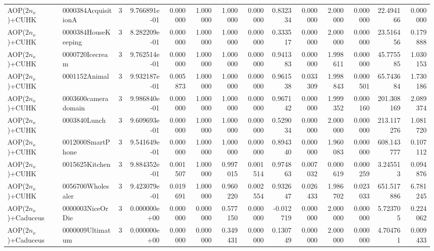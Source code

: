 \begin{tabular}{llrr|r|rr|rr|rr|rrr}
        AOP($2 n_o$)+CUHK &    0000384AcquisitionA &       3 & 9.766891e-01 & 0.000000 & 1.000000 &      1.000000 & 0.000000 &      0.832334 & 0.000000 &      2.000000 &    0.000000 &    22.494166 &    0.000000 \\
        AOP($2 n_o$)+CUHK &    0000384HouseKeeping &       3 & 8.282209e-01 & 0.000000 & 1.000000 &      1.000000 & 0.000000 &      0.333517 & 0.000000 &      2.000000 &    0.000000 &    23.516456 &    0.179888 \\
        AOP($2 n_o$)+CUHK &        0000720Icecream &       3 & 9.762514e-01 & 0.000000 & 1.000000 &      1.000000 & 0.000000 &      0.941383 & 0.000000 &      1.998611 &    0.000000 &    45.775585 &    1.030153 \\
        AOP($2 n_o$)+CUHK &          0001152Animal &       3 & 9.932187e-01 & 0.005873 & 1.000000 &      1.000000 & 0.000000 &      0.961538 & 0.033309 &      1.998843 &    0.000501 &    65.743684 &    1.730186 \\
        AOP($2 n_o$)+CUHK &    0003600cameradomain &       3 & 9.986840e-01 & 0.000000 & 1.000000 &      1.000000 & 0.000000 &      0.967142 & 0.000000 &      1.999352 &    0.000160 &   201.308169 &    2.089374 \\
        AOP($2 n_o$)+CUHK &           0003840Lunch &       3 & 9.609693e-01 & 0.000000 & 1.000000 &      1.000000 & 0.000000 &      0.529034 & 0.000000 &      2.000000 &    0.000000 &   213.117276 &    1.081720 \\
        AOP($2 n_o$)+CUHK &      0012000SmartPhone &       3 & 9.541649e-01 & 0.000000 & 1.000000 &      1.000000 & 0.000000 &      0.894340 & 0.000000 &      1.960083 &    0.000000 &   608.143777 &    0.107112 \\
        AOP($2 n_o$)+CUHK &         0015625Kitchen &       3 & 9.884352e-01 & 0.001507 & 1.000000 &      0.997015 & 0.001514 &      0.974863 & 0.007032 &      0.000619 &    0.000259 &     3.245513 &    0.094876 \\
        AOP($2 n_o$)+CUHK &      0056700Wholesaler &       3 & 9.423079e-01 & 0.019691 & 1.000000 &      0.960220 & 0.002554 &      0.932647 & 0.026433 &      1.986702 &    0.023033 &   651.517886 &    6.781245 \\
    AOP($2 n_o$)+Caduceus &       0000003NiceOrDie &       3 & 0.000000e+00 & 0.000000 & 0.000000 &      0.577150 & 0.000000 &     -0.012719 & 0.000000 &      2.000000 &    0.000000 &     5.723705 &    0.224062 \\
    AOP($2 n_o$)+Caduceus &       0000009Ultimatum &       3 & 0.000000e+00 & 0.000000 & 0.000000 &      0.349431 & 0.000000 &      0.130749 & 0.000000 &      2.000000 &    0.000000 &     4.704761 &    0.009433 \\

\end{tabular}
